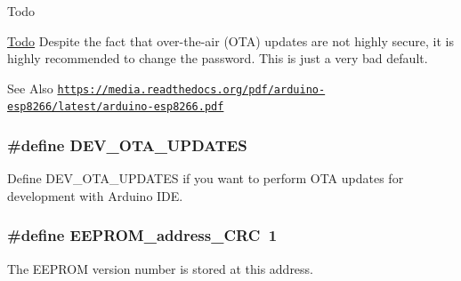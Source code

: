 \begin{DoxyRefDesc}{Todo}
\item[\hyperlink{todo__todo000001}{Todo}]Despite the fact that over-\/the-\/air (O\-T\-A) updates are not highly secure, it is highly recommended to change the password. This is just a very bad default. \begin{DoxySeeAlso}{See Also}
\href{https://media.readthedocs.org/pdf/arduino-esp8266/latest/arduino-esp8266.pdf}{\tt https\-://media.\-readthedocs.\-org/pdf/arduino-\/esp8266/latest/arduino-\/esp8266.\-pdf} 
\end{DoxySeeAlso}
\end{DoxyRefDesc}
\hypertarget{WIFIOnOff_8ino_a29b6e2877e1ad309ad7f24c22f97eed1}{
\subsubsection[{D\-E\-V\-\_\-\-O\-T\-A\-\_\-\-U\-P\-D\-A\-T\-E\-S}]{\setlength{\rightskip}{0pt plus 5cm}\#define D\-E\-V\-\_\-\-O\-T\-A\-\_\-\-U\-P\-D\-A\-T\-E\-S}}\label{WIFIOnOff_8ino_a29b6e2877e1ad309ad7f24c22f97eed1}


Define D\-E\-V\-\_\-\-O\-T\-A\-\_\-\-U\-P\-D\-A\-T\-E\-S if you want to perform O\-T\-A updates for development with Arduino I\-D\-E. 

\hypertarget{WIFIOnOff_8ino_ab384daae78d017828d89c6d9c697021a}{
\subsubsection[{E\-E\-P\-R\-O\-M\-\_\-address\-\_\-\-C\-R\-C}]{\setlength{\rightskip}{0pt plus 5cm}\#define E\-E\-P\-R\-O\-M\-\_\-address\-\_\-\-C\-R\-C~1}}\label{WIFIOnOff_8ino_ab384daae78d017828d89c6d9c697021a}


The E\-E\-P\-R\-O\-M version number is stored at this address. 

